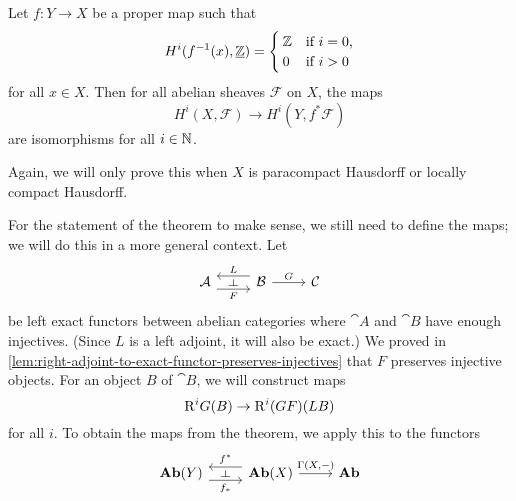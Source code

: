 \begin{thm}\label{thm:Vietoris-Begle-mapping-theorem}
Let \(f\colon Y\to X\) be a proper map such that
\[ H^i(f^{-1}(x),\underline{\mathbb{Z}}) =
  \begin{cases}
    \mathbb{Z} & \text{if } i = 0\text{,} \\
    0 & \text{if } i>0
  \end{cases}
\]
for all \(x\in X\).
Then for all abelian sheaves \(\mathcal F\) on \(X\), the maps
\[ H^i(X,\mathcal F)\to H^i(Y,f^*\mathcal F) \]
are isomorphisms for all \(i\in\mathbb{N}\).
\end{thm}

Again, we will only prove this when \(X\) is paracompact Hausdorff or locally compact Hausdorff.

For the statement of the theorem to make sense, we still need to define the maps; we will do this in a more general context.
Let
\begin{equation*}
  \begin{tikzcd}
    \cat A \ar[r, "F"'{name=rightadj}, shift right=2] &
    \cat B \ar[l, "L"'{name=leftadj}, shift right=2] \ar[r, "G"] &
    \cat C
    \ar[from=leftadj, to=rightadj, phantom, "\leftadj" rotate=-90]
  \end{tikzcd}
\end{equation*}
be left exact functors between abelian categories where \(\cat A\) and \(\cat B\) have enough injectives.
(Since \(L\) is a left adjoint, it will also be exact.)
We proved in \cref{lem:right-adjoint-to-exact-functor-preserves-injectives} that \(F\) preserves injective objects.
For an object \(B\) of \(\cat B\), we will construct maps
\[ \mathrm{R}^iG(B) \to \mathrm{R}^i(GF)(LB) \]
for all \(i\).
To obtain the maps from the theorem, we apply this to the functors
\begin{equation*}
  \begin{tikzcd}
    \catAbelianSheaf(Y) \ar[r, "f_*"'{name=rightadj}, shift right=2] &
    \catAbelianSheaf(X) \ar[l, "f^*"'{name=leftadj}, shift right=2] \ar[r, "{\Gamma(X,-)}"] &
    \catAbelianGroup
    \ar[from=leftadj, to=rightadj, phantom, "\leftadj" rotate=-90]
  \end{tikzcd}
\end{equation*}


